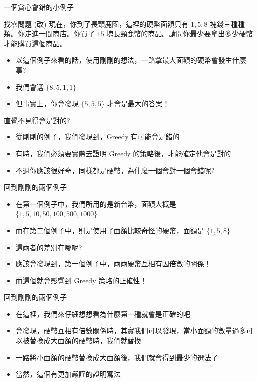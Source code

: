 \documentclass[aspectratio=169]{beamer}
\begin{document}
    \begin{frame}{一個貪心會錯的小例子}
        \begin{block}{找零問題 (改)}
            現在，你到了長頸鹿國，這裡的硬幣面額只有 $1, 5, 8$ 塊錢三種種類。你走進一間商店。你買了 $15$ 塊長頸鹿幣的商品。請問你最少要拿出多少硬幣才能購買這個商品。
        \end{block}
        \begin{itemize}
            \item 以這個例子來看的話，使用剛剛的想法，一路拿最大面額的硬幣會發生什麼事?
            \item<2-> 我們會選 $\{8,5,1,1\}$
            \item<3-> 但事實上，你會發現 $\{5,5,5\}$ 才會是最大的答案！
        \end{itemize}
    \end{frame}
    
    \begin{frame}{直覺不見得會是對的?}
        \begin{itemize}
            \item 從剛剛的例子，我們發現到，Greedy 有可能會是錯的
            \item 有時，我們必須要實際去證明 Greedy 的策略後，才能確定他會是對的
            \item<2-> 不過你應該很好奇，同樣都是硬幣，為什麼一個會對一個會錯呢?
        \end{itemize}
    \end{frame}
    
    \begin{frame}{回到剛剛的兩個例子}
        \begin{itemize}
            \item 在第一個例子中，我們所用的是新台幣，面額大概是 $\{1,5,10,50,100,500,1000\}$
            \item 而在第二個例子中，則是使用了面額比較奇怪的硬幣，面額是 $\{1,5,8\}$
            \item 這兩者的差別在哪呢?
            \item<2-> 應該會發現到，第一個例子中，兩兩硬幣互相有因倍數的關係！
            \item<2-> 而這個就會影響到 Greedy 策略的正確性！
        \end{itemize}
    \end{frame}
    
    \begin{frame}{回到剛剛的兩個例子}
        \begin{itemize}
            \item 在這裡，我們來仔細想想看為什麼第一種就會是正確的吧
            \item<2-> 會發現，硬幣互相有倍數關係時，其實我們可以發現，當小面額的數量過多可以被替換成大面額的硬幣時，我們就替換
            \item<2-> 一路將小面額的硬幣替換成大面額後，我們就會得到最少的選法了
            \item<3-> 當然，這個有更加嚴謹的證明寫法
        \end{itemize}
    \end{frame}
    
\end{document}
